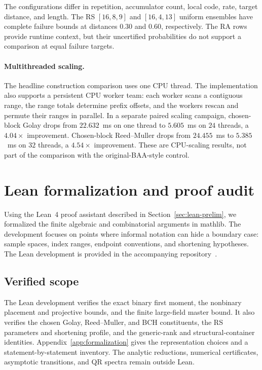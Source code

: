 \documentclass[runningheads,envcountsame,envcountsect]{llncs}
\begin{document}
The configurations differ in repetition, accumulator count, local code,
rate, target distance, and length.  The RS $[16,8,9]$ and $[16,4,13]$
uniform ensembles have complete failure bounds at distances $0.30$ and
$0.60$, respectively.  The RA rows provide runtime context, but their
uncertified probabilities do not support a comparison at equal failure targets.



\paragraph{Multithreaded scaling.}
The headline construction comparison uses one CPU thread.  The implementation
also supports a persistent CPU worker team: each worker scans a contiguous
range, the range totals determine prefix offsets, and the workers rescan and
permute their ranges in parallel.  In a separate paired scaling campaign,
 chosen-block Golay drops from $22.632$~ms on one thread to $5.605$~ms on $24$
threads, a $4.04\times$ improvement.  Chosen-block Reed--Muller drops from
$24.455$~ms to $5.385$~ms on $32$ threads, a $4.54\times$ improvement.  These
 are CPU-scaling results, not part of the comparison with the original-BAA-style
 control.

\section{Lean formalization and proof audit}
\label{sec:lean}

Using the Lean~4 proof assistant described in
Section~\ref{sec:lean-prelim}, we formalized the finite algebraic and
combinatorial arguments in mathlib.  The development focuses on points where
informal notation can hide a boundary case: sample spaces, index ranges,
endpoint conventions, and shortening hypotheses.  The Lean development is
provided in the accompanying repository~\cite{chosenbaaartifact}.

\subsection{Verified scope}
The Lean development verifies the exact binary first moment, the nonbinary
placement and projective bounds, and the finite large-field master bound.
It also verifies the chosen Golay, Reed--Muller, and BCH constituents, the
RS parameters and shortening profile, and the generic-rank and
structural-container identities.
Appendix~\ref{app:formalization} gives the representation choices and a
statement-by-statement inventory.  The analytic reductions, numerical
certificates, asymptotic transitions, and QR spectra remain outside Lean.
\end{document}

